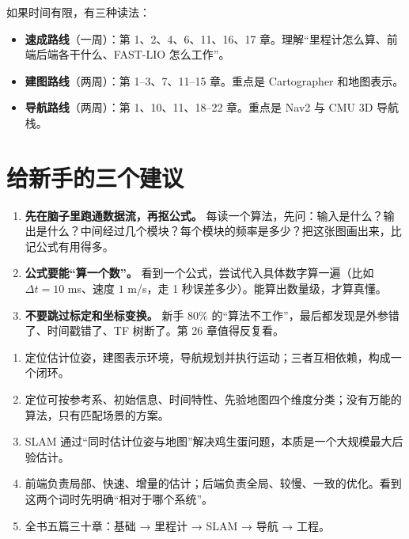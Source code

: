 如果时间有限，有三种读法：

\begin{itemize}
  \item \textbf{速成路线}（一周）：第 1、2、4、6、11、16、17 章。理解“里程计怎么算、前端后端各干什么、FAST-LIO 怎么工作”。
  \item \textbf{建图路线}（两周）：第 1--3、7、11--15 章。重点是 Cartographer 和地图表示。
  \item \textbf{导航路线}（两周）：第 1、10、11、18--22 章。重点是 Nav2 与 CMU 3D 导航栈。
\end{itemize}

\section{给新手的三个建议}\label{sec:01-advice}

\begin{enumerate}
  \item \textbf{先在脑子里跑通数据流，再抠公式。} 每读一个算法，先问：输入是什么？输出是什么？中间经过几个模块？每个模块的频率是多少？把这张图画出来，比记公式有用得多。
  \item \textbf{公式要能“算一个数”。} 看到一个公式，尝试代入具体数字算一遍（比如 $\Delta t=10$ ms、速度 $1$ m/s，走 1 秒误差多少）。能算出数量级，才算真懂。
  \item \textbf{不要跳过标定和坐标变换。} 新手 80\% 的“算法不工作”，最后都发现是外参错了、时间戳错了、TF 树断了。第 26 章值得反复看。
\end{enumerate}

\begin{summary}

\begin{enumerate}
  \item 定位估计位姿，建图表示环境，导航规划并执行运动；三者互相依赖，构成一个闭环。
  \item 定位可按参考系、初始信息、时间特性、先验地图四个维度分类；没有万能的算法，只有匹配场景的方案。
  \item SLAM 通过“同时估计位姿与地图”解决鸡生蛋问题，本质是一个大规模最大后验估计。
  \item 前端负责局部、快速、增量的估计；后端负责全局、较慢、一致的优化。看到这两个词时先明确“相对于哪个系统”。
  \item 全书五篇三十章：基础 → 里程计 → SLAM → 导航 → 工程。
\end{enumerate}

\end{summary}

